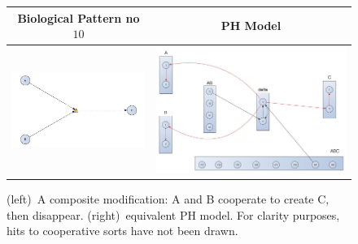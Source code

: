 \documentclass[11pt,a4paper,twoside]{epig}
\begin{document}
\begin{figure}[ht]
\begin{tabular}{|c|c|}
\hline
Biological Pattern no $10$ & PH Model \\
\hline
 \includegraphics[scale=0.3]{./imagesannexe/phdrawings/10cyt.jpg} & \includegraphics[scale=0.15]{./imagesannexe/phdrawings/10ph.jpg} \\
  \hline
\end{tabular}
\caption{\label{fig:pattern:10}
(left)~A composite modification: A and B cooperate to create C, then disappear. 
(right)~equivalent PH model. For clarity purposes, 
hits to cooperative sorts have not been drawn.
}
\end{figure}
\end{document}
